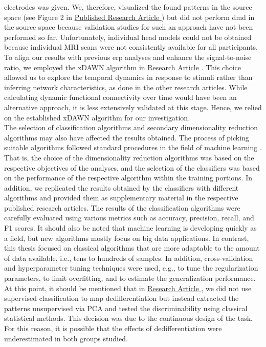 electrodes was given. We, therefore, visualized the found patterns in the source space (see Figure 2 in \hyperref[pub:paperIII]{Published Research Article }) but did not perform \gls{dmd} in the source space because validation studies for such an approach have not been performed so far. Unfortunately, individual head models could not be obtained because individual MRI scans were not consistently available for all participants.\\
To align our results with previous \gls{erp} analyses and enhance the signal-to-noise ratio, we employed the xDAWN algorithm in \hyperref[results:paperII]{Research Article }. This choice allowed us to explore the temporal dynamics in response to stimuli rather than inferring network characteristics, as done in the other research articles. While calculating dynamic functional connectivity over time would have been an alternative approach, it is less extensively validated at this stage. Hence, we relied on the established xDAWN algorithm for our investigation.\\
The selection of classification algorithms and secondary dimensionality reduction algorithms may also have affected the results obtained. The process of picking suitable algorithms followed standard procedures in the field of machine learning \cite{Shalev2014}. That is, the choice of the dimensionality reduction algorithms was based on the respective objectives of the analyses, and the selection of the classifiers was based on the performance of the respective algorithm within the training portions. In addition, we replicated the results obtained by the classifiers with different algorithms and provided them as supplementary material in the respective published research articles. The results of the classification algorithms were carefully evaluated using various metrics such as accuracy, precision, recall, and F1 scores. It should also be noted that machine learning is developing quickly as a field, but new algorithms mostly focus on big data applications. In contrast, this thesis focused on classical algorithms that are more adaptable to the amount of data available, i.e., tens to hundreds of samples. In addition, cross-validation and hyperparameter tuning techniques were used, e.g., to tune the regularization parameters, to limit overfitting, and to estimate the generalization performance.\\
At this point, it should be mentioned that in \hyperref[results:paperIII]{Research Article }, we did not use supervised classification to map dedifferentiation but instead extracted the patterns unsupervised via PCA and tested the discriminability using classical statistical methods. This decision was due to the continuous design of the task. For this reason, it is possible that the effects of dedifferentiation were underestimated in both groups studied.\\

